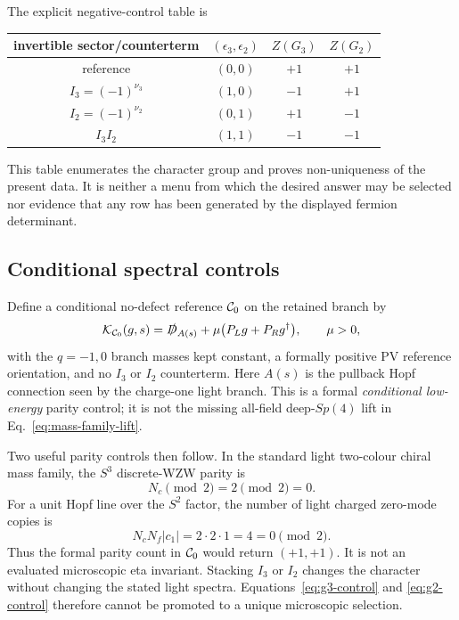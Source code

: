 \documentclass[11pt]{article}
\theoremstyle{definition}
\theoremstyle{remark}
\begin{document}
The explicit negative-control table is
\begin{center}
\begin{tabular}{cccc}
\toprule
invertible sector/counterterm & \((\epsilon_3,\epsilon_2)\) & \(Z(G_3)\) & \(Z(G_2)\)\\
\midrule
reference & \((0,0)\) & \(+1\) & \(+1\)\\
\(I_3=(-1)^{\nu_3}\) & \((1,0)\) & \(-1\) & \(+1\)\\
\(I_2=(-1)^{\nu_2}\) & \((0,1)\) & \(+1\) & \(-1\)\\
\(I_3I_2\) & \((1,1)\) & \(-1\) & \(-1\)\\
\bottomrule
\end{tabular}
\end{center}
This table enumerates the character group and proves non-uniqueness of the
present data.  It is neither a menu from which the desired answer may be
selected nor evidence that any row has been generated by the displayed
fermion determinant.

\subsection{Conditional spectral controls}

Define a conditional no-defect reference \({\cal C}_0\) on the retained
branch by
\begin{equation}
 \mathcal K_{{\cal C}_0}(g,s)
 =\slashed D_{A(s)}+
 \mu\bigl(P_Lg+P_Rg^\dagger\bigr),
 \qquad \mu>0,
 \label{eq:conditional-c0}
\end{equation}
with the \(q=-1,0\) branch masses kept constant, a formally positive PV
reference orientation, and no \(I_3\) or \(I_2\) counterterm.  Here \(A(s)\) is the pullback
Hopf connection seen by the charge-one light branch.  This is a formal
\emph{conditional low-energy} parity control; it is not the missing all-field
deep-\(Sp(4)\) lift in Eq.~\eqref{eq:mass-family-lift}.

Two useful parity controls then follow.  In the standard light two-colour
chiral mass family, the \(S^3\) discrete-WZW parity is
\begin{equation}
 N_c\pmod2=2\pmod2=0.
 \label{eq:g3-control}
\end{equation}
For a unit Hopf line over the \(S^2\) factor, the number of light charged
zero-mode copies is
\begin{equation}
 N_cN_f|c_1|=2\cdot2\cdot1=4=0\pmod2.
 \label{eq:g2-control}
\end{equation}
Thus the formal parity count in \({\cal C}_0\) would return \((+1,+1)\).
It is not an evaluated microscopic eta invariant.  Stacking \(I_3\) or
\(I_2\) changes the character without changing the stated
light spectra.  Equations~\eqref{eq:g3-control} and
\eqref{eq:g2-control} therefore cannot be promoted to a unique
microscopic selection.
\end{document}

